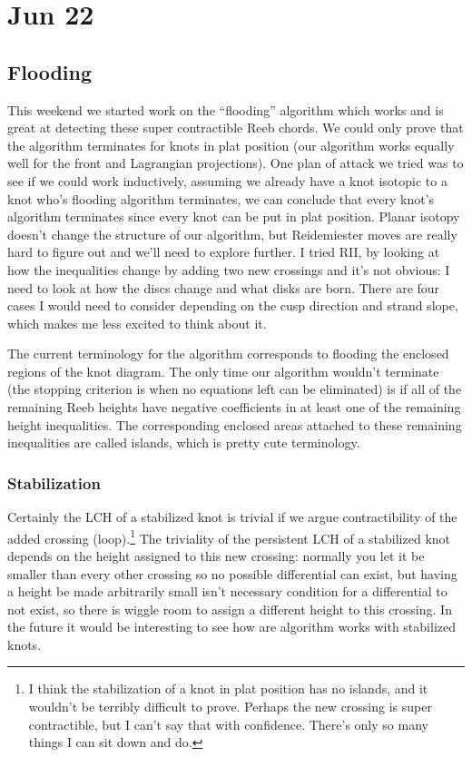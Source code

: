 \documentclass[11pt,oneside]{amsart}
\begin{document}
\rhead{\rightmark \today}
\tableofcontents
\newpage

\section*{Jun 22}
\subsection*{Flooding} This weekend we started work on the ``flooding'' algorithm which works and is great at detecting these super contractible Reeb chords. We could only prove that the algorithm terminates for knots in plat position (our algorithm works equally well for the front and Lagrangian projections). One plan of attack we tried was to see if we could work inductively, assuming we already have a knot isotopic to a knot who's flooding algorithm terminates, we can conclude that every knot's algorithm terminates since every knot can be put in plat position. Planar isotopy doesn't change the structure of our algorithm, but Reidemiester moves are really hard to figure out and we'll need to explore further. I tried RII, by looking at how the inequalities change by adding two new crossings and it's not obvious: I need to look at how the discs change and what disks are born. There are four cases I would need to consider depending on the cusp direction and strand slope, which makes me less excited to think about it.

The current terminology for the algorithm corresponds to flooding the enclosed regions of the knot diagram. The only time our algorithm wouldn't terminate (the stopping criterion is when no equations left can be eliminated) is if all of the remaining Reeb heights have negative coefficients in at least one of the remaining height inequalities. The corresponding enclosed areas attached to these remaining inequalities are called islands, which is pretty cute terminology.

\subsubsection*{Stabilization} Certainly the LCH of a stabilized knot is trivial if we argue contractibility of the added crossing (loop).\footnote{I think the stabilization of a knot in plat position has no islands, and it wouldn't be terribly difficult to prove. Perhaps the new crossing is super contractible, but I can't say that with confidence. There's only so many things I can sit down and do.} The triviality of the persistent LCH of a stabilized knot depends on the height assigned to this new crossing: normally you let it be smaller than every other crossing so no possible differential can exist, but having a height be made arbitrarily small isn't necessary condition for a differential to not exist, so there is wiggle room to assign a different height to this crossing. In the future it would be interesting to see how are algorithm works with stabilized knots.
\end{document}

